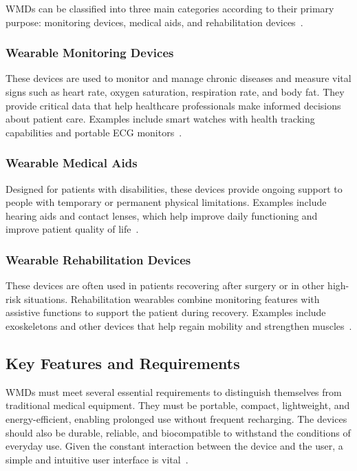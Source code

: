 \documentclass[journal]{IEEEtran}
\begin{document}
    WMDs can be classified into three main categories according to their primary purpose: monitoring devices, medical aids, and rehabilitation devices~\cite{Fotiadis2006}.
    
        \subsubsection{Wearable Monitoring Devices}
        
        These devices are used to monitor and manage chronic diseases and measure vital signs such as heart rate, oxygen saturation, respiration rate, and body fat. They provide critical data that help healthcare professionals make informed decisions about patient care. Examples include smart watches with health tracking capabilities and portable ECG monitors~\cite{Fotiadis2006}.

        \subsubsection{Wearable Medical Aids}
        
        Designed for patients with disabilities, these devices provide ongoing support to people with temporary or permanent physical limitations. Examples include hearing aids and contact lenses, which help improve daily functioning and improve patient quality of life~\cite{Hemapriya2017}.

        \subsubsection{Wearable Rehabilitation Devices}
        
        These devices are often used in patients recovering after surgery or in other high-risk situations. Rehabilitation wearables combine monitoring features with assistive functions to support the patient during recovery. Examples include exoskeletons and other devices that help regain mobility and strengthen muscles~\cite{Hemapriya2017}.

    \subsection{Key Features and Requirements}
    
    WMDs must meet several essential requirements to distinguish themselves from traditional medical equipment. They must be portable, compact, lightweight, and energy-efficient, enabling prolonged use without frequent recharging. The devices should also be durable, reliable, and biocompatible to withstand the conditions of everyday use. Given the constant interaction between the device and the user, a simple and intuitive user interface is vital~\cite{Lu2020}.
\end{document}
